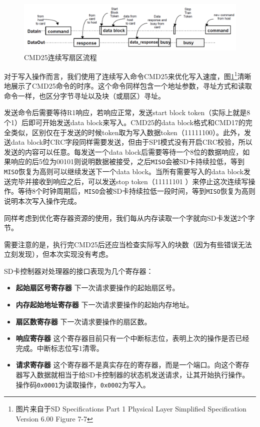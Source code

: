 \documentclass[11pt,utf8]{report}
\begin{document}
	\begin{figure}[h!]
		\centering
		\includegraphics[width=\textwidth]{cmd25}
		\caption{CMD25连续写扇区流程}
		\label{cmd25}
	\end{figure}
	
	\par 对于写入操作而言，我们使用了连续写入命令CMD25来优化写入速度，图\ref{cmd25}\footnote{图片来自于SD Specifications Part 1 Physical Layer Simplified Specification Version 6.00 Figure 7-7}清晰地展示了CMD25命令的时序。这个命令同样包含一个地址参数，寻址方式和读取命令一样，也区分字节寻址以及块（或扇区）寻址。
	
	\par 发送命令后需要等待R1响应，若响应正常，发送start block token（实际上就是8个1）后即可开始发送data block来写入。CMD25的data block格式和CMD17的完全类似，区别仅在于发送的时候token取为写入数据token（11111100）。此外，发送data block时CRC字段同样需要发送，但由于SPI模式没有开启CRC校验，所以发送的内容可以任意。每发送一个data block后需要等待一个8位的数据响应，如果响应的后5位为00101则说明数据被接受，之后\texttt{MISO}会被SD卡持续拉低，等到\texttt{MISO}恢复为高则可以继续发送下一个data block。当所有需要写入的data block发送完毕并接收到响应之后，可以发送stop token（11111101 ）来停止这次连续写操作。等待8个时钟周期后，\texttt{MISO}会被SD卡持续拉低一段时间，等到\texttt{MISO}恢复为高则说明本次写入操作完成。
	
	\par 同样考虑到优化寄存器资源的使用，我们每从内存读取一个字就向SD卡发送2个字节。
	
	\par 需要注意的是，执行完CMD25后还应当检查实际写入的块数（因为有些错误无法立刻发现），但本次实现没有考虑。
	
	\par SD卡控制器对处理器的接口表现为几个寄存器：
	\begin{itemize}
		\item \textbf{起始扇区号寄存器} 下一次请求要操作的起始扇区号。
		\item \textbf{内存起始地址寄存器} 下一次请求要操作的起始内存地址。
		\item \textbf{扇区数寄存器} 下一次请求要操作的扇区数。
		\item \textbf{响应寄存器} 这个寄存器目前只有一个中断标志位，表明上次的操作是否已经完成。中断标志位写1清零。
		\item \textbf{请求寄存器} 这个寄存器不是真实存在的寄存器，而是一个端口。向这个寄存器写入数据就相当于给SD卡控制器的状态机发送请求，让其开始执行操作。操作码\texttt{0x0001}为读取操作，\texttt{0x0002}为写入。
	\end{itemize}
	
\end{document}

